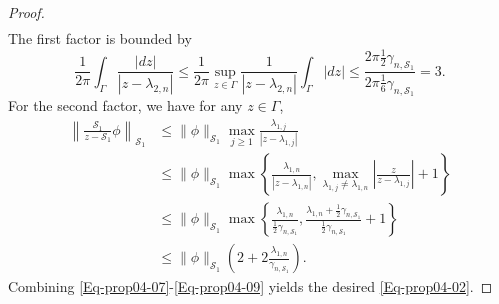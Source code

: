 \documentclass{sn-jnl}%
\numberwithin{equation}{section}
\theoremstyle{thmstyleone}%
\theoremstyle{thmstyletwo}%
\theoremstyle{thmstylethree}%
\begin{document}
\begin{appendices}
\begin{proof}
\begin{equation}
\begin{aligned}
        \end{aligned}
    \end{equation}
    The first factor is bounded by
    \begin{equation}\label{Eq-prop05-09}
        \frac{1}{2\pi}\int_{\Gamma}\frac{|d z|}{|z-\lambda_{2,n}|}
        \leq \frac{1}{2\pi}\sup_{z\in \Gamma}\frac{1}{|z-\lambda_{2,n}|}\int_{\Gamma}|dz| 
        \leq \frac{2\pi \frac{1}{2}\gamma_{n,\mathcal{S}_1}}{2\pi \frac{1}{6}\gamma_{n,\mathcal{S}_1}} = 3.
    \end{equation}
    For the second factor, we have for any $z \in \Gamma$,
    \begin{equation}\label{Eq-prop04-09}
    \begin{aligned}
        \left\|\frac{\mathcal{S}_1}{z-\mathcal{S}_1}\phi\right\|_{\mathcal{S}_1} 
        &\leq  \|\phi\|_{\mathcal{S}_1}\max_{j \geq 1}\frac{\lambda_{1,j}}{|z-\lambda_{1,j}|}\\
        &\leq  \|\phi\|_{\mathcal{S}_1} \max\left\{ \frac{\lambda_{1,n}}{|z-\lambda_{1,n}|},  \max_{\lambda_{1,j}\neq \lambda_{1,n}} \left| \frac{z}{z-\lambda_{1,j}}\right|+1 \right\}\\
        &\leq  \|\phi\|_{\mathcal{S}_1} \max\left\{ \frac{\lambda_{1,n}}{\frac{1}{2}\gamma_{n,\mathcal{S}_1}},  \frac{\lambda_{1,n}+\frac{1}{2}\gamma_{n,\mathcal{S}_1}}{\frac{1}{2}\gamma_{n,\mathcal{S}_1}}+1 \right\}\\
        &\leq  \|\phi\|_{\mathcal{S}_1}(2+2\frac{\lambda_{1,n}}{\gamma_{n,\mathcal{S}_1}}). 
    \end{aligned}
    \end{equation}
    Combining \eqref{Eq-prop04-07}-\eqref{Eq-prop04-09} yields the desired \eqref{Eq-prop04-02}.
\end{proof}



\end{appendices}
\end{document}

